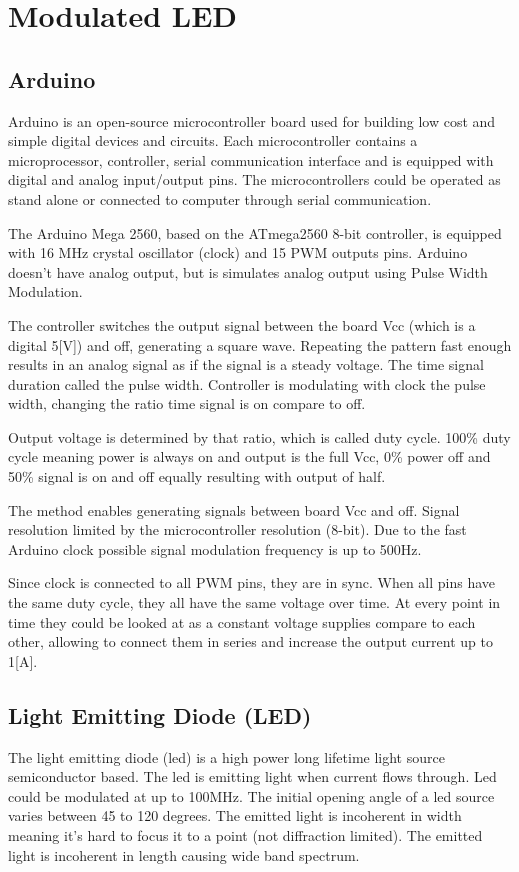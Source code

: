 \documentclass[\main/master.tex]{subfiles}
\begin{document}
\section{Modulated LED}
\subsection{Arduino}
Arduino is an open-source microcontroller board used for building low cost and simple digital devices and circuits. Each microcontroller contains a microprocessor, controller, serial communication interface and is equipped with digital and analog input/output pins. The microcontrollers could be operated as stand alone or connected to computer through serial communication. 
\par\noindent
The Arduino Mega 2560, based on the ATmega2560 8-bit controller, is equipped with 16 MHz crystal oscillator (clock) and 15 PWM outputs pins. Arduino doesn't have analog output, but is simulates analog output using Pulse Width Modulation.
\par\noindent
The controller switches the output signal between the board Vcc (which is a digital 5[V]) and off, generating a square wave.
Repeating the pattern fast enough results in an analog signal as if the signal is a steady voltage. The time signal duration called the pulse width. Controller is modulating with clock the pulse width, changing the ratio time signal is on compare to off. 
\par\noindent
Output voltage is determined by that ratio, which is called duty cycle. 100\% duty cycle meaning power is always on and output is the full Vcc, 0\% power off and 50\% signal is on and off equally resulting with output of half. 
\par\noindent
The method enables generating signals between board Vcc and off. Signal resolution limited by the microcontroller resolution (8-bit). Due to the fast Arduino clock possible signal modulation frequency is up to 500Hz.
\par\noindent
Since clock is connected to all PWM pins, they are in sync. When all pins have the same duty cycle, they all have the same voltage over time. At every point in time they could be looked at as a constant voltage supplies compare to each other, allowing to connect them in series and increase the output current up to 1[A]. 
\subsection{Light Emitting Diode (LED)}
The light emitting diode (led) is a high power long lifetime light source semiconductor based. The led is emitting light when current flows through. Led could be modulated at up to 100MHz. The initial opening angle of a led source varies between 45 to 120 degrees. The emitted light is incoherent in width meaning it's hard to focus it to a point (not diffraction limited). The emitted light is incoherent in length causing wide band spectrum.
\end{document}
